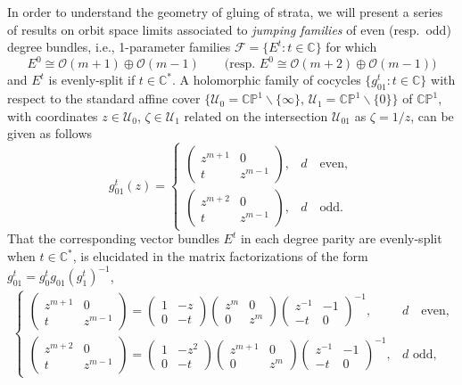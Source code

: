 \documentclass[10pt,a4paper]{amsart}
\newcommand{\field}[1]{\ensuremath{\mathbb{#1}}}
\newcommand{\CC}{\field{C}}
\newcommand{\PP}{\field{P}}
\newcommand{\calO}{\mathcal{O}}
\newcommand{\curly}[1]{\mathscr{#1}}
\newcommand{\cF}{\curly{F}}
\newcommand{\cU}{\curly{U}}
\numberwithin{equation}{section}
\begin{document}
In order to understand the geometry of gluing of strata, we will present a series of results on orbit space limits associated to \textit{jumping families} of even (resp.~odd) degree bundles, i.e., 1-parameter families $\cF = \{E^{t}\colon t\in\CC\}$ for which
\[
E^{0}\cong \calO(m+1)\oplus\calO(m-1)\qquad \big(\text{resp. } E^{0}\cong \calO(m+2)\oplus\calO(m-1)\big)
\]
and $E^{t}$ is evenly-split if $t\in\CC^{*}$. A holomorphic family of cocycles $\{g_{01}^{t}\colon t\in\CC\}$ with respect to the standard affine cover $\{\cU_{0}= \CC\PP^{1}\backslash\{\infty\}$, $\cU_{1}= \CC\PP^{1}\backslash\{0\}\}$ of $\CC\PP^{1}$, with coordinates $z\in\cU_{0}$, $\zeta\in\cU_{1}$ related on the intersection $\cU_{01}$ as $\zeta = 1/z$, can be given as follows
\[
g^{t}_{01}(z) = \begin{cases}
\begin{pmatrix}
z^{m+1} & 0\\
t & z^{m-1}
\end{pmatrix}\!, & d\quad \text{even},
\\[3ex]
\begin{pmatrix}
z^{m+2} & 0\\
t & z^{m-1}
\end{pmatrix}\!, & d\quad \text{odd}.
\end{cases}
\]
That the corresponding vector bundles $E^{t}$ in each degree parity are evenly-split when $t\in\CC^{*}$, is elucidated in the matrix factorizations of the form $g^{t}_{01} = g^{t}_{0}g_{01}(g^{t}_{1})^{-1}$,
\begin{gather}\label{eq:cocycle}
 \begin{cases}
\begin{pmatrix}
z^{m+1} & 0\\
t & z^{m-1}
\end{pmatrix} =
\begin{pmatrix}
1 & -z\\
0 & -t
\end{pmatrix}
\begin{pmatrix}
z^{m} & 0\\
0& z^{m}
\end{pmatrix}
\begin{pmatrix}
z^{-1} & -1\\
-t & 0
\end{pmatrix}^{-1}, & d \quad \text{even},
\\[3ex]
\begin{pmatrix}
z^{m+2} & 0\\
t & z^{m-1}
\end{pmatrix} =
\begin{pmatrix}
1 & -z^{2}\\
0 & -t
\end{pmatrix}
\begin{pmatrix}
z^{m+1} & 0\\
0& z^{m}
\end{pmatrix}
\begin{pmatrix}
z^{-1}& -1\\
-t& 0
\end{pmatrix}^{-1}, & d \text{ odd},
\end{cases}
\end{gather}
\end{document}
